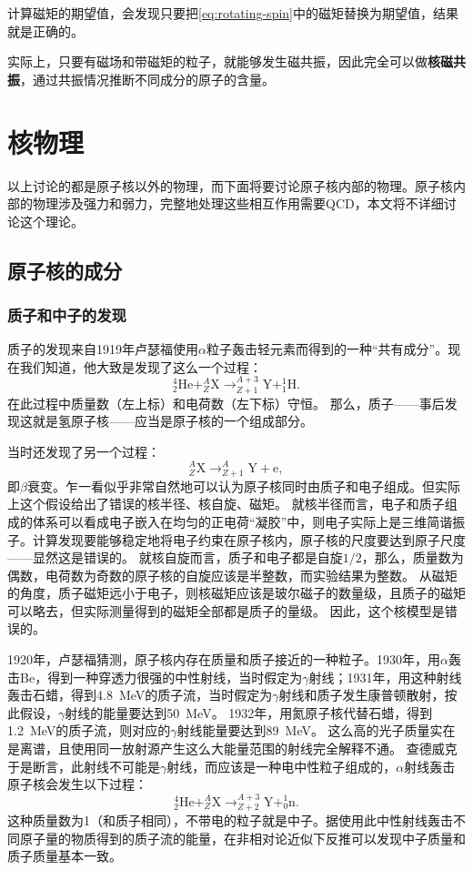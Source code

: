 \documentclass[UTF8, a4paper]{ctexart}
\newcommand*{\nuclear}[3]{^{#2}_{#3}\text{#1}}
\begin{document}
计算磁矩的期望值，会发现只要把\eqref{eq:rotating-spin}中的磁矩替换为期望值，结果就是正确的。

实际上，只要有磁场和带磁矩的粒子，就能够发生磁共振，因此完全可以做\textbf{核磁共振}，通过共振情况推断不同成分的原子的含量。

\section{核物理}

以上讨论的都是原子核以外的物理，而下面将要讨论原子核内部的物理。原子核内部的物理涉及强力和弱力，完整地处理这些相互作用需要QCD，本文将不详细讨论这个理论。

\subsection{原子核的成分}

\subsubsection{质子和中子的发现}

质子的发现来自1919年卢瑟福使用$\alpha$粒子轰击轻元素而得到的一种“共有成分”。现在我们知道，他大致是发现了这么一个过程：
\[
    \nuclear{He}{4}{2} + \nuclear{X}{A}{Z} \longrightarrow \nuclear{Y}{A+3}{Z+1} + \nuclear{H}{1}{1}.
\]
在此过程中质量数（左上标）和电荷数（左下标）守恒。
那么，质子——事后发现这就是氢原子核——应当是原子核的一个组成部分。

当时还发现了另一个过程：
\[
    \nuclear{X}{A}{Z} \longrightarrow \nuclear{Y}{A}{Z+1} + \text{e},
\]
即$\beta$衰变。乍一看似乎非常自然地可以认为原子核同时由质子和电子组成。但实际上这个假设给出了错误的核半径、核自旋、磁矩。
就核半径而言，电子和质子组成的体系可以看成电子嵌入在均匀的正电荷“凝胶”中，则电子实际上是三维简谐振子。计算发现要能够稳定地将电子约束在原子核内，原子核的尺度要达到原子尺度——显然这是错误的。
就核自旋而言，质子和电子都是自旋$1/2$，那么，质量数为偶数，电荷数为奇数的原子核的自旋应该是半整数，而实验结果为整数。
从磁矩的角度，质子磁矩远小于电子，则核磁矩应该是玻尔磁子的数量级，且质子的磁矩可以略去，但实际测量得到的磁矩全部都是质子的量级。
因此，这个核模型是错误的。

1920年，卢瑟福猜测，原子核内存在质量和质子接近的一种粒子。1930年，用$\alpha$轰击Be，得到一种穿透力很强的中性射线，当时假定为$\gamma$射线；1931年，用这种射线轰击石蜡，得到\SI{4.8}{MeV}的质子流，当时假定为$\gamma$射线和质子发生康普顿散射，按此假设，$\gamma$射线的能量要达到\SI{50}{MeV}。
1932年，用氮原子核代替石蜡，得到\SI{1.2}{MeV}的质子流，则对应的$\gamma$射线能量要达到\SI{89}{MeV}。
这么高的光子质量实在是离谱，且使用同一放射源产生这么大能量范围的射线完全解释不通。
查德威克于是断言，此射线不可能是$\gamma$射线，而应该是一种电中性粒子组成的，$\alpha$射线轰击原子核会发生以下过程：
\[
    \nuclear{He}{4}{2} + \nuclear{X}{A}{Z} \longrightarrow \nuclear{Y}{A+3}{Z+2} + \nuclear{n}{1}{0}.
\]
这种质量数为1（和质子相同），不带电的粒子就是中子。据使用此中性射线轰击不同原子量的物质得到的质子流的能量，在非相对论近似下反推可以发现中子质量和质子质量基本一致。
\end{document}
